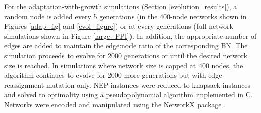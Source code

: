  For the adaptation-with-growth simulations  (Section \ref{evolution_results}), a random node is added every 5 generations (in the 400-node networks
 shown in Figures \ref{adap_fig} and \ref{evol_figure}) 
 or at every generations  (full-network simulations shown in Figure \ref{large_PPI}). 
 In addition,  the appropriate number of edges are added to maintain the  edge:node ratio of the corresponding BN. The simulation 
 proceeds to evolve for 2000 generations or until the desired network size is reached. 
 In simulations where network size is capped at 400 nodes, the algorithm continues to evolve for 2000 more generations 
 but with edge-reassignment mutation only. NEP instances were reduced to knapsack instances \cite{atiia_computational_2017-1} 
 and solved to optimality using a pseudopolynomial algorithm \cite{pisinger_where_2005} 
 implemented in C. Networks were encoded and manipulated using the NetworkX package \cite{schult_exploring_2008}.
 \begin{comment}
 The Bacteria Regulatory network was extract from RegulonDB \cite{gama-castro_regulondb_2016} 
 with interactions that meet have the following properties:(1) Experimentally-validated (as opposed to computationally-predicted), 
(2) Have "Strong" or "Confirmed" evidence (as opposed to "Weak"), (3) Randomized +/- interaction effect (promotional/inhibitory) in
 cases where the RegulonDB designates it as "?" (unknown) or +/- (dual), 
(4) Interactions are between transcription factor (TF)-Gene, TF-TF (non of small RNA (sRNA) -Gene interactions have "Strong" or 
"Confirmed" evidence so there were excluded\footnote{\scriptsize{ see http://regulondb.ccg.unam.mx/menu/download/datasets/files/sRNABindingSiteSet.txt}}, 
(5) Interactions involving Sigma proteins are not included since they are very common to all transcriptions and therefore do not in and of themselves control the combinatorial regulatory state of the organism, and 
(6) In cases where an interaction was reported more than once, and the reported sign doesn't agree, the sign is randomized with more likelihood proportional to the number of times it was reported (e.g. if a reaction was reported four times and the signs were [+ + + -] were reported, a '+' is chosen with  75\% chance. 
All other networks represent (undirected) protein-protein networks and were taken as is from their respective sources. 
\end{comment}
